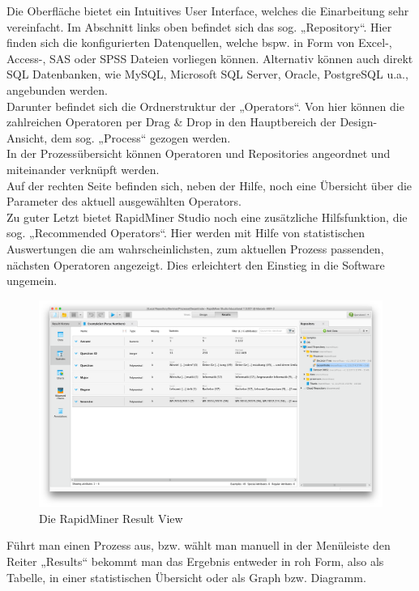 Die Oberfläche bietet ein Intuitives User Interface, welches die Einarbeitung
sehr vereinfacht. Im Abschnitt links oben befindet sich das sog. „Repository“.
Hier finden sich die konfigurierten Datenquellen, welche bspw. in Form von
Excel-, Access-, SAS oder SPSS Dateien vorliegen können. Alternativ können auch
direkt SQL Datenbanken, wie MySQL, Microsoft SQL Server, Oracle, PostgreSQL
u.a., angebunden werden. \\
Darunter befindet sich die Ordnerstruktur der „Operators“. Von hier können die
zahlreichen Operatoren per Drag & Drop in den Hauptbereich der Design-Ansicht,
dem sog. „Process“ gezogen werden. \\
In der Prozessübersicht können Operatoren und Repositories angeordnet und
miteinander verknüpft werden. \\
Auf der rechten Seite befinden sich, neben der Hilfe, noch eine Übersicht über
die Parameter des aktuell ausgewählten Operators. \\
Zu guter Letzt bietet RapidMiner Studio noch eine zusätzliche Hilfsfunktion,
die sog. „Recommended Operators“. Hier werden mit Hilfe von statistischen
Auswertungen die am wahrscheinlichsten, zum aktuellen Prozess passenden,
nächsten Operatoren angezeigt. Dies erleichtert den Einstieg in die Software ungemein.

\begin{figure}[htb]
  \includegraphics[width=\textwidth]{gfx/rm3.png}
	\caption{Die RapidMiner Result View}
	\label{fig:software:rm:res}
\end{figure}

Führt man einen Prozess aus, bzw. wählt man manuell in der Menüleiste den Reiter
„Results“ bekommt man das Ergebnis entweder in roh Form, also als Tabelle, in
einer statistischen Übersicht oder als Graph bzw. Diagramm.


